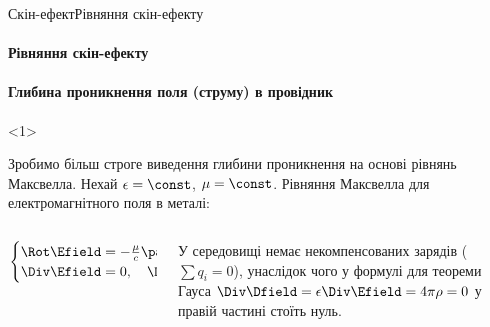 \documentclass[onlytextwidth]{beamer}
\begin{document}
\begin{frame}{Скін-ефект}{Рівняння скін-ефекту}
	\framesubtitle<1>{Рівняння скін-ефекту}
	\framesubtitle<2>{Глибина проникнення поля (струму) в провідник}
	\begin{onlyenv}\small
		\begin{block}{}\justifying
			Зробимо більш строге виведення глибини проникнення на основі рівнянь Максвелла.
			Нехай $\epsilon = \const$, $\mu = \const$.
			Рівняння Максвелла для
			електромагнітного поля в металі:
			\begin{columns}
				\begin{column}{0.4\linewidth}
					\begin{equation*}
						\begin{cases}
							\Rot\Efield = - \frac{\mu}{c}\parttime{\Hfield},\quad \Rot\Hfield = \frac{4\pi}{c}\vect{j}, \\
							\Div\Efield= 0, \quad \Div\Hfield = 0.
						\end{cases}
					\end{equation*}
				\end{column}
				\begin{column}{0.6\linewidth}
					\begin{block}{}\justifying\footnotesize
						У середовищі немає некомпенсованих зарядів ($\sum q_i = 0$), унаслідок чого у формулі для теореми Гауса
						$\Div\Dfield = \epsilon\Div\Efield =  4\pi\rho = 0$ у правій частині стоїть нуль.
					\end{block}
				\end{column}
			\end{columns}
		\end{block}


\end{onlyenv}
\end{frame}
\end{document}
